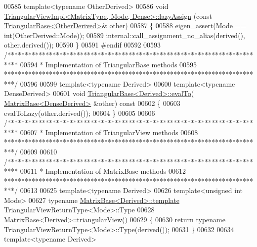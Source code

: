 \begin{DoxyCode}
00585 \textcolor{keyword}{template}<\textcolor{keyword}{typename} OtherDerived>
00586 \textcolor{keywordtype}{void} \hyperlink{class_eigen_1_1_triangular_view_impl}{TriangularViewImpl<MatrixType, Mode, Dense>::lazyAssign}
      (\textcolor{keyword}{const} \hyperlink{group___core___module_class_eigen_1_1_triangular_base}{TriangularBase<OtherDerived>}& other)
00587 \{
00588   eigen\_assert(Mode == \textcolor{keywordtype}{int}(OtherDerived::Mode));
00589   internal::call\_assignment\_no\_alias(derived(), other.derived());
00590 \}
00591 \textcolor{preprocessor}{#endif}
00592 
00593 \textcolor{comment}{/***************************************************************************}
00594 \textcolor{comment}{* Implementation of TriangularBase methods}
00595 \textcolor{comment}{***************************************************************************/}
00596 
00599 \textcolor{keyword}{template}<\textcolor{keyword}{typename} Derived>
00600 \textcolor{keyword}{template}<\textcolor{keyword}{typename} DenseDerived>
00601 \textcolor{keywordtype}{void} \hyperlink{group___core___module_class_eigen_1_1_triangular_base}{TriangularBase<Derived>::evalTo}(
      \hyperlink{group___core___module_class_eigen_1_1_matrix_base}{MatrixBase<DenseDerived>} &other)\textcolor{keyword}{ const}
00602 \textcolor{keyword}{}\{
00603   evalToLazy(other.derived());
00604 \}
00605 
00606 \textcolor{comment}{/***************************************************************************}
00607 \textcolor{comment}{* Implementation of TriangularView methods}
00608 \textcolor{comment}{***************************************************************************/}
00609 
00610 \textcolor{comment}{/***************************************************************************}
00611 \textcolor{comment}{* Implementation of MatrixBase methods}
00612 \textcolor{comment}{***************************************************************************/}
00613 
00625 \textcolor{keyword}{template}<\textcolor{keyword}{typename} Derived>
00626 \textcolor{keyword}{template}<\textcolor{keywordtype}{unsigned} \textcolor{keywordtype}{int} Mode>
00627 \textcolor{keyword}{typename} \hyperlink{group___core___module_class_eigen_1_1_matrix_base}{MatrixBase<Derived>::template} TriangularViewReturnType<Mode>::Type
00628 \hyperlink{group___core___module_class_eigen_1_1_matrix_base}{MatrixBase<Derived>::triangularView}()
00629 \{
00630   \textcolor{keywordflow}{return} \textcolor{keyword}{typename} TriangularViewReturnType<Mode>::Type(derived());
00631 \}
00632 
00634 \textcolor{keyword}{template}<\textcolor{keyword}{typename} Derived>

\end{DoxyCode}
